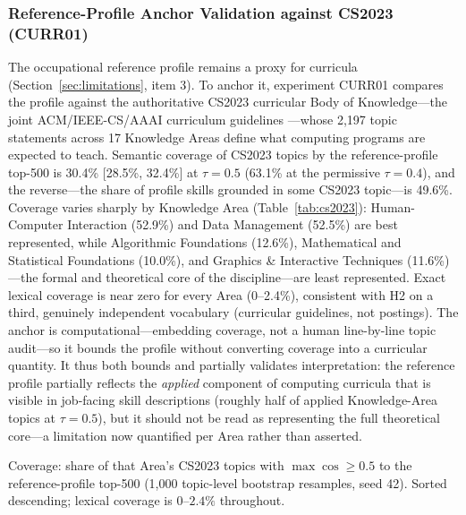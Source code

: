 \documentclass[journal]{IEEEtran}
\begin{document}
\subsubsection{Reference-Profile Anchor Validation against CS2023 (CURR01)}
\label{sec:curr01}

The occupational reference profile remains a proxy for curricula (Section~\ref{sec:limitations}, item 3). To anchor it, experiment CURR01 compares the profile against the authoritative CS2023 curricular Body of Knowledge---the joint ACM/IEEE-CS/AAAI curriculum guidelines \cite{taskforce2024cs2023}---whose 2,197 topic statements across 17 Knowledge Areas define what computing programs are expected to teach. Semantic coverage of CS2023 topics by the reference-profile top-500 is 30.4\% [28.5\%, 32.4\%] at $\tau = 0.5$ (63.1\% at the permissive $\tau = 0.4$), and the reverse---the share of profile skills grounded in some CS2023 topic---is 49.6\%. Coverage varies sharply by Knowledge Area (Table~\ref{tab:cs2023}): Human-Computer Interaction (52.9\%) and Data Management (52.5\%) are best represented, while Algorithmic Foundations (12.6\%), Mathematical and Statistical Foundations (10.0\%), and Graphics \& Interactive Techniques (11.6\%)---the formal and theoretical core of the discipline---are least represented. Exact lexical coverage is near zero for every Area (0--2.4\%), consistent with H2 on a third, genuinely independent vocabulary (curricular guidelines, not postings). The anchor is computational---embedding coverage, not a human line-by-line topic audit---so it bounds the profile without converting coverage into a curricular quantity. It thus both bounds and partially validates interpretation: the reference profile partially reflects the \textit{applied} component of computing curricula that is visible in job-facing skill descriptions (roughly half of applied Knowledge-Area topics at $\tau = 0.5$), but it should not be read as representing the full theoretical core---a limitation now quantified per Area rather than asserted.

\begin{table}[!htbp]
\centering
\caption{Semantic Coverage of CS2023 Knowledge Areas by the Occupational Reference Profile (CURR01; $\tau = 0.5$)}
\label{tab:cs2023}
\resizebox{\columnwidth}{!}{%

}
\par\vspace{3pt}
{\footnotesize Coverage: share of that Area's CS2023 topics with $\max\cos \ge 0.5$ to the reference-profile top-500 (1,000 topic-level bootstrap resamples, seed 42). Sorted descending; lexical coverage is $0$--$2.4\%$ throughout.}
\end{table}
\end{document}
